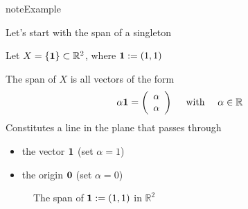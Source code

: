 \documentclass[letterpaper,10pt,english]{jupyterBook}
\begin{document}
\begin{sphinxadmonition}{note}{Example}

\sphinxAtStartPar
Let’s start with the span of a singleton

\sphinxAtStartPar
Let \(X = \{ {\bf 1} \} \subset \mathbb{R}^2\), where \({\bf 1} := (1,1)\)

\sphinxAtStartPar
The span of \(X\) is all vectors of the form
\begin{equation*}
\begin{split}
%
\alpha {\bf 1} 
=
\left(
\begin{array}{c}
\alpha \\
\alpha
\end{array}
\right)
\quad \text{ with } \quad \alpha \in \mathbb{R} 
%
\end{split}
\end{equation*}
\sphinxAtStartPar
Constitutes a line in the plane that passes through
\begin{itemize}
\item {} 
\sphinxAtStartPar
the vector \({\bf 1}\) (set \(\alpha = 1\))

\item {} 
\sphinxAtStartPar
the origin \({\bf 0}\) (set \(\alpha = 0\))

\end{itemize}
\end{sphinxadmonition}

\begin{figure}[htbp]
\centering
\capstart

\noindent{}
\caption{The span of \({\bf 1} := (1,1)\) in \(\mathbb{R}^2\)}\label{\detokenize{05.linear_algebra:id3}}\end{figure}
\end{document}
